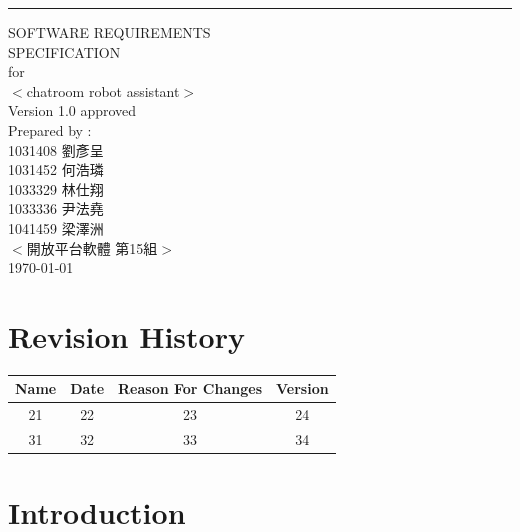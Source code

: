 \documentclass{scrreprt}
\date{}
\def\myversion{1.0 }
\begin{document}
\begin{CJK}{UTF8}{bkai}

\begin{flushright}
    \rule{16cm}{5pt}\vskip1cm
    \begin{bfseries}
        \Huge{SOFTWARE REQUIREMENTS\\ SPECIFICATION}\\
        \vspace{1.9cm}
        for\\
        \vspace{1.0cm}
        $<$chatroom robot assistant$>$\\
        \vspace{1.0cm}
        \LARGE{Version \myversion approved}\\
        \vspace{1.0cm}
         Prepared by :  \\
	   1031408 劉彥呈\\
	   1031452 何浩璘\\
	   1033329 林仕翔\\
	   1033336 尹法堯\\
        1041459 梁澤洲\\
        \vspace{1.0cm}
        $<$開放平台軟體 第15組$>$\\
        \vspace{1.0cm}
        \today\\
    \end{bfseries}
\end{flushright}

\tableofcontents


\chapter*{Revision History}

\begin{center}
    \begin{tabular}{|c|c|c|c|}
        \hline
	    Name & Date & Reason For Changes & Version\\
        \hline
	    21 & 22 & 23 & 24\\
        \hline
	    31 & 32 & 33 & 34\\
        \hline
    \end{tabular}
\end{center}

\chapter{Introduction}


\end{CJK}
\end{document}
